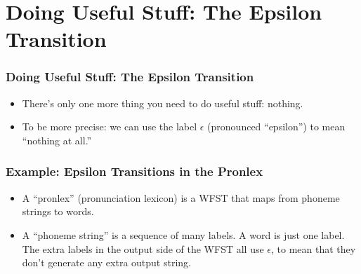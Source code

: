 \documentclass{beamer}
\begin{document}
\section[Epsilon]{Doing Useful Stuff: The Epsilon Transition}
\setcounter{subsection}{1}

\begin{frame}
  \frametitle{Doing Useful Stuff: The Epsilon Transition}
  \begin{itemize}
  \item There's only one more thing you need to do useful stuff: nothing.
  \item To be more precise: we can use the label $\epsilon$
    (pronounced ``epsilon'') to mean ``nothing at all.''
  \end{itemize}
\end{frame}

\begin{frame}
  \frametitle{Example: Epsilon Transitions in the Pronlex}

  \begin{itemize}
  \item A ``pronlex'' (pronunciation lexicon) is a WFST that maps from
    phoneme strings to words.
  \item A ``phoneme string'' is a sequence of many labels.  A word is just one label.
    The extra labels in the output side of the WFST all use $\epsilon$, to mean that
    they don't generate any extra output string.
  \end{itemize}
\end{frame}
\end{document}
